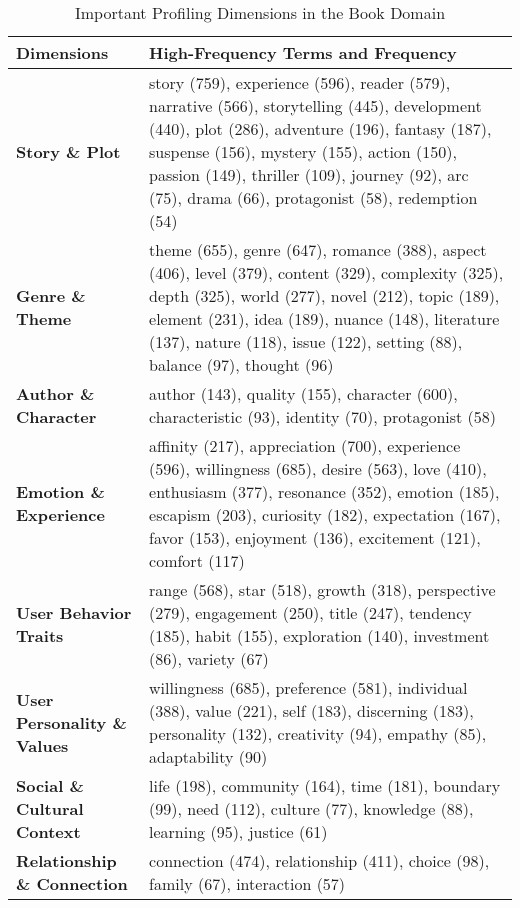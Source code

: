 \begin{table*}[t]
      \small
      \centering
      \caption{Important Profiling Dimensions in the Book Domain}
      \begin{tabular}{lp{7.5cm}}  %
      \toprule
      \textbf{Dimensions}            & \textbf{High-Frequency Terms and Frequency}                                                                                                      \\ \midrule
      \textbf{Story \& Plot}       & story (759), experience (596), reader (579), narrative (566), storytelling (445), development (440), plot (286), adventure (196), fantasy (187), suspense (156), mystery (155), action (150), passion (149), thriller (109), journey (92), arc (75), drama (66), protagonist (58), redemption (54)           \\ \midrule
      \textbf{Genre \& Theme}      & theme (655), genre (647), romance (388), aspect (406), level (379), content (329), complexity (325), depth (325), world (277), novel (212), topic (189), element (231), idea (189), nuance (148), literature (137), nature (118), issue (122), setting (88), balance (97), thought (96)      \\ \midrule
      \textbf{Author \& Character} & author (143), quality (155), character (600), characteristic (93), identity (70), protagonist (58) \\ \midrule
      \textbf{Emotion \& Experience}  & affinity (217), appreciation (700), experience (596), willingness (685), desire (563), love (410), enthusiasm (377), resonance (352), emotion (185), escapism (203), curiosity (182), expectation (167), favor (153), enjoyment (136), excitement (121), comfort (117) \\ \midrule
      \textbf{User Behavior Traits}  & range (568), star (518), growth (318), perspective (279), engagement (250), title (247), tendency (185), habit (155), exploration (140), investment (86), variety (67) \\ \midrule
      \textbf{User Personality \& Values} & willingness (685), preference (581), individual (388), value (221), self (183), discerning (183), personality (132), creativity (94), empathy (85), adaptability (90) \\ \midrule
      \textbf{Social \& Cultural Context} & life (198), community (164), time (181), boundary (99), need (112), culture (77), knowledge (88), learning (95), justice (61) \\ \midrule
      \textbf{Relationship \& Connection} & connection (474), relationship (411), choice (98), family (67), interaction (57) \\ \bottomrule
      \end{tabular}
      \label{tab:profiling_dimensions}
    \end{table*}
    
